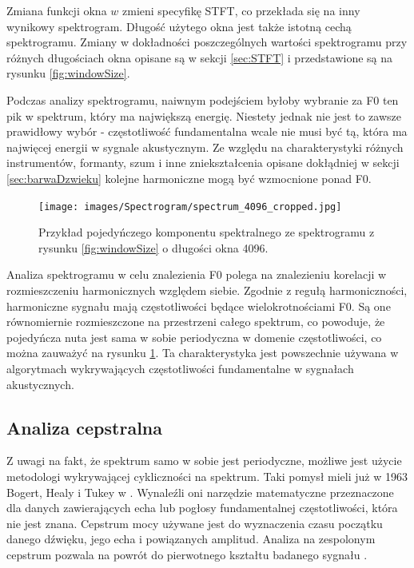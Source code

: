 \documentclass[12pt,a4paper,twoside]{mwart}
\begin{document}
Zmiana funkcji okna $w$ zmieni specyfikę STFT, co przekłada się na inny wynikowy spektrogram. Długość użytego okna jest także istotną cechą spektrogramu. Zmiany w dokładności poszczególnych wartości spektrogramu przy różnych długościach okna opisane są w sekcji \ref{sec:STFT} i przedstawione są na rysunku \ref{fig:windowSize}.

Podczas analizy spektrogramu, naiwnym podejściem byłoby wybranie za F0 ten pik w spektrum, który ma największą energię. Niestety jednak nie jest to zawsze prawidłowy wybór - częstotliwość fundamentalna wcale nie musi być tą, która ma najwięcej energii w sygnale akustycznym. Ze względu na charakterystyki różnych instrumentów, formanty, szum i inne zniekształcenia opisane dokłądniej w sekcji \ref{sec:barwaDzwieku} kolejne harmoniczne mogą być wzmocnione ponad F0.

\begin{figure}[t]
  \begin{center}
    \texttt{[image: images/Spectrogram/spectrum\_4096\_cropped.jpg]}
    \caption{Przykład pojedyńczego komponentu spektralnego ze spektrogramu z rysunku \ref{fig:windowSize} o długości okna 4096.}
    \label{fig:spectralComponent}
  \end{center}
\end{figure}

Analiza spektrogramu w celu znalezienia F0 polega na znalezieniu korelacji w rozmieszczeniu harmonicznych względem siebie. Zgodnie z regułą harmoniczności, harmoniczne sygnału mają częstotliwości będące wielokrotnościami F0. Są one równomiernie rozmieszczone na przestrzeni całego spektrum, co powoduje, że pojedyńcza nuta jest sama w sobie periodyczna w domenie częstotliwości, co można zauważyć na rysunku \ref{fig:spectralComponent}. Ta charakterystyka jest powszechnie używana w algorytmach wykrywających częstotliwości fundamentalne w sygnałach akustycznych.

\subsection{Analiza cepstralna}\label{sec:f0:ceps}
Z uwagi na fakt, że spektrum samo w sobie jest periodyczne, możliwe jest użycie metodologi wykrywającej cykliczności na spektrum. Taki pomysł mieli już w 1963 Bogert, Healy i Tukey w \cite{Transcription:Bogert:FirstCepstrum}. Wynaleźli oni narzędzie matematyczne przeznaczone dla danych zawierających echa lub pogłosy fundamentalnej częstotliwości, która nie jest znana. Cepstrum mocy używane jest do wyznaczenia czasu początku danego dźwięku, jego echa i powiązanych amplitud. Analiza na zespolonym cepstrum pozwala na powrót do pierwotnego kształtu badanego sygnału \cite{Transcription:Childers:CepstruGuide} 
\cite[46-50]{Transcription:Quenneville:Thesis}.
\end{document}
